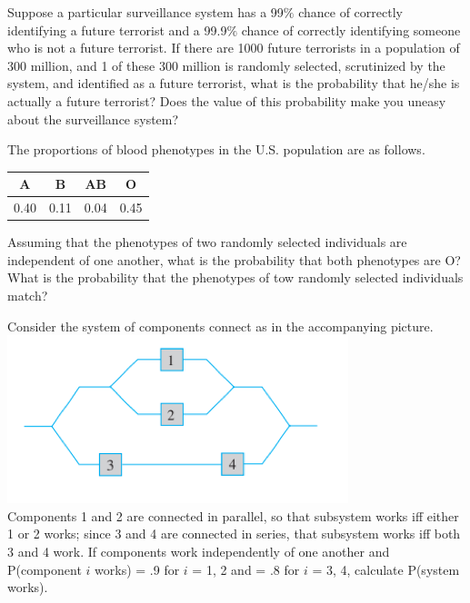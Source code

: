\documentclass[12pt,letterpaper]{hmcpset}
\begin{document}
\begin{solution}

\end{solution}
\newpage

\begin{problem}[2.4.67]
Suppose a particular surveillance system has a 99$\%$ chance of correctly identifying a future terrorist and a 99.9$\%$ chance of correctly identifying someone who is not a future terrorist. If there are 1000 future terrorists in a population of 300 million, and 1 of these 300 million is randomly selected, scrutinized by the system, and identified as a future terrorist, what is the probability that he/she is actually a future terrorist? Does the value of this probability make you uneasy about the surveillance system?

\end{problem}

\begin{solution}

\end{solution}
\newpage

\begin{problem}[2.5.74]
The proportions of blood phenotypes in the U.S. population are as follows.\\
\begin{center}
	\begin{tabular}{c|c|c|c}
 		A & B & AB & O \\
 		\hline
 		0.40 & 0.11 & 0.04 & 0.45
	 \end{tabular}
\end{center}
Assuming that the phenotypes of two randomly selected individuals are independent of one another, what is the probability that both phenotypes are O? What is the probability that the phenotypes of tow randomly selected individuals match?
\end{problem}

\begin{solution}

\end{solution}
\newpage

\begin{problem}[2.5.80]
Consider the system of components connect as in the accompanying picture.
\includegraphics[scale=1]{Nov_3_2.png}\\
    Components 1 and 2 are connected in parallel, so that subsystem works iff either 1 or 2 works; since 3 and 4 are connected in series, that subsystem works iff both 3 and 4 work. If components work independently of one another and P(component $i$ works) = .9 for $i$ = 1, 2 and = .8 for $i$ = 3, 4, calculate P(system works).
\\
\end{problem}

\begin{solution}

\end{solution}
\end{document}
